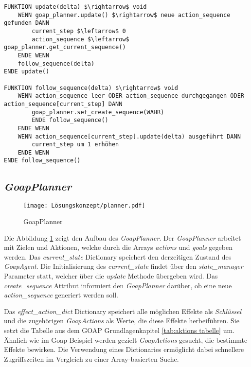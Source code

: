 \begin{lstlisting}[language=Pseudo, caption={update Methode des GoapAgent}, mathescape=true, label={lst:pseudo update}]
FUNKTION update(delta) $\rightarrow$ void
    WENN goap_planner.update() $\rightarrow$ neue action_sequence gefunden DANN
        current_step $\leftarrow$ 0
        action_sequence $\leftarrow$ goap_planner.get_current_sequence()
    ENDE WENN
    follow_sequence(delta)
ENDE update()

FUNKTION follow_sequence(delta) $\rightarrow$ void
	WENN action_sequence leer ODER action_sequence durchgegangen ODER action_sequence[current_step] DANN
		goap_planner.set_create_sequence(WAHR)
		ENDE follow_sequence()
	ENDE WENN
	WENN action_sequence[current_step].update(delta) ausgeführt DANN
		current_step um 1 erhöhen
	ENDE WENN
ENDE follow_sequence()
\end{lstlisting}














\subsection{\textit{GoapPlanner}}
\label{chap:goapplanner uml}


\begin{figure}[h]
  \centering
  \texttt{[image: Lösungskonzept/planner.pdf]}
	\captionsetup{justification=justified, format=plain}
  \caption{GoapPlanner}
  \label{fig:goapplanner uml}
\end{figure}

Die Abbildung \ref{fig:goapplanner uml} zeigt den Aufbau des \textit{GoapPlanner}. Der \textit{GoapPlanner} arbeitet mit Zielen und Aktionen, welche durch die Arrays \textit{actions} und \textit{goals} gegeben werden. Das \textit{current\_state} Dictionary speichert den derzeitigen Zustand des \textit{GoapAgent}. Die Initialisierung des \textit{current\_state} findet über den \textit{state\_manager} Parameter statt, welcher über die \textit{update} Methode übergeben wird. Das \textit{create\_sequence} Attribut informiert den \textit{GoapPlanner} darüber, ob eine neue \textit{action\_sequence} generiert werden soll. 

Das \textit{effect\_action\_dict} Dictionary speichert alle möglichen Effekte als \textit{Schlüssel} und die zugehörigen \textit{GoapActions} als Werte, die diese Effekte herbeiführen. Sie setzt die Tabelle aus dem GOAP Grundlagenkapitel \ref{tab:aktions tabelle} um. Ähnlich wie im Goap-Beispiel werden gezielt \textit{GoapActions} gesucht, die bestimmte Effekte bewirken. Die Verwendung eines Dictionaries ermöglicht dabei schnellere Zugriffszeiten im Vergleich zu einer Array-basierten Suche.

